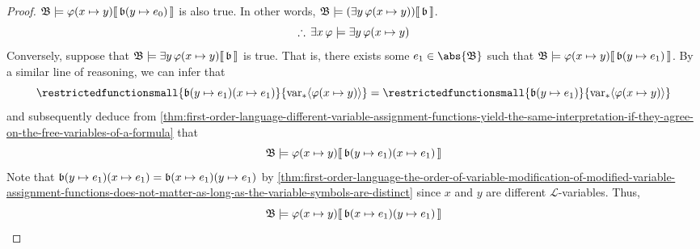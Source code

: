 \begin{proof}
    \( \folwffsatisfaction{\mathfrak{B}}{ \folfreevariablereplacement{\varphi}{x}{y} }{ \folmodifiedvariableassignmentfunction{\mathfrak{b}}{y}{e_{0}} } \)
    is also true. In other words, \( \folwffsatisfaction{\mathfrak{B}}{ \mleft( \exists y \, \folfreevariablereplacement{\varphi}{x}{y} \mright) }{\mathfrak{b}} \).
    \begin{equation*}
        \therefore \, \exists x \, \varphi \models \exists y \, \folfreevariablereplacement{\varphi}{x}{y}
    \end{equation*}
    Conversely, suppose that \( \folwffsatisfaction{\mathfrak{B}}{ \exists y \, \folfreevariablereplacement{\varphi}{x}{y} }{\mathfrak{b}} \) is true. That is,
    there exists some \( e_{1} \in \abs{\mathfrak{B}} \) such that
    \( \folwffsatisfaction{\mathfrak{B}}{ \folfreevariablereplacement{\varphi}{x}{y} }{ \folmodifiedvariableassignmentfunction{\mathfrak{b}}{y}{e_{1}} } \).
    By a similar line of reasoning, we can infer that
    \begin{equation*}
        \restrictedfunctionsmall{ \folmodifiedvariableassignmentfunction{ \folmodifiedvariableassignmentfunction{\mathfrak{b}}{y}{e_{1}} }{x}{e_{1}} }{ \folfreevars{ \folfreevariablereplacement{\varphi}{x}{y} } }
        = \restrictedfunctionsmall{ \folmodifiedvariableassignmentfunction{\mathfrak{b}}{y}{e_{1}} }{ \folfreevars{ \folfreevariablereplacement{\varphi}{x}{y} } }
    \end{equation*}
    and subsequently deduce from \cref{thm:first-order-language-different-variable-assignment-functions-yield-the-same-interpretation-if-they-agree-on-the-free-variables-of-a-formula} that
    \begin{equation*}
        \folwffsatisfaction{\mathfrak{B}}{ \folfreevariablereplacement{\varphi}{x}{y} }{ \folmodifiedvariableassignmentfunction{ \folmodifiedvariableassignmentfunction{\mathfrak{b}}{y}{e_{1}} }{x}{e_{1}} }
    \end{equation*}
    Note that \( \folmodifiedvariableassignmentfunction{ \folmodifiedvariableassignmentfunction{\mathfrak{b}}{y}{e_{1}} }{x}{e_{1}}
    = \folmodifiedvariableassignmentfunction{ \folmodifiedvariableassignmentfunction{\mathfrak{b}}{x}{e_{1}} }{y}{e_{1}} \)
    by \cref{thm:first-order-language-the-order-of-variable-modification-of-modified-variable-assignment-functions-does-not-matter-as-long-as-the-variable-symbols-are-distinct}
    since \( x \) and \( y \) are different \( \mathcal{L} \)-variables. Thus,
    \begin{equation*}
        \folwffsatisfaction{\mathfrak{B}}{ \folfreevariablereplacement{\varphi}{x}{y} }{ \folmodifiedvariableassignmentfunction{ \folmodifiedvariableassignmentfunction{\mathfrak{b}}{x}{e_{1}} }{y}{e_{1}} }

\end{equation*}
\end{proof}
